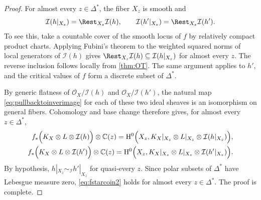 \begin{proof}
For almost every $z\in\Delta^*$, the fiber $X_z$ is smooth and
\[
\mathcal I(h|_{X_z})=\Rest_{X_z}\mathcal I(h),\qquad
\mathcal I(h'|_{X_z})=\Rest_{X_z}\mathcal I(h').
\]
To see this, take a countable cover of the smooth locus of $f$ by relatively compact product charts. Applying Fubini's theorem to the weighted squared norms of local generators of $\mathcal I(h)$ gives
$\Rest_{X_z}\mathcal I(h)\subseteq\mathcal I(h|_{X_z})$ for almost every $z$. The reverse inclusion follows locally from \cref{thm:OT}. The same argument applies to $h'$, and the critical values of $f$ form a discrete subset of $\Delta^*$.

By generic flatness of $\mathcal O_X/\mathcal I(h)$ and $\mathcal O_X/\mathcal I(h')$, the natural map \eqref{eq:pullbacktoinverimage} for each of these two ideal sheaves is an isomorphism on general fibers. Cohomology and base change therefore gives, for almost every $z\in \Delta^*$,
\[
\begin{split}
f_*\Bigl(K_{X}\otimes L\otimes \mathcal{I}(h)\Bigr) \otimes \mathbb{C}(z)=\mathrm{H}^0\Bigl(X_z,K_{X}|_{X_z}\otimes L|_{X_z}\otimes \mathcal{I}(h|_{X_z})\Bigr),\\
f_*\Bigl(K_{X}\otimes L\otimes \mathcal{I}(h')\Bigr) \otimes \mathbb{C}(z)=\mathrm{H}^0\Bigl(X_z,K_{X}|_{X_z}\otimes L|_{X_z}\otimes \mathcal{I}(h'|_{X_z})\Bigr).
\end{split}
\]
By hypothesis, $h|_{X_z}\sim_{\mathcal{I}}h'|_{X_z}$ for quasi-every $z$. Since polar subsets of $\Delta^*$ have Lebesgue measure zero, \eqref{eq:fstarcoin2} holds for almost every $z\in\Delta^*$. The proof is complete.
\end{proof}
